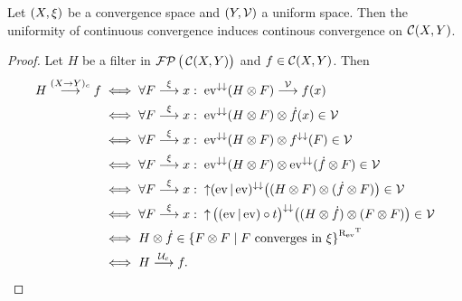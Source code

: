 \begin{lemma}
Let $\left( X, \xi \right)$ be a convergence space and $\left( Y, \mathcal{V} \right)$ a uniform space. Then the uniformity of continuous convergence induces continous convergence on $\operatorname{\mathcal{C}}(X, Y)$.
\end{lemma}
\begin{proof}
Let $H$ be a filter in $\operatorname{\mathcal{FP}}\big(\operatorname{\mathcal{C}}(X,Y)\big)$ and $f\in \operatorname{\mathcal{C}}(X, Y)$. Then
\begin{align*}
H\overset{(X\to Y)_c}{\longrightarrow} f &\iff \forall F\overset{\xi}{\longrightarrow}x: \; \operatorname{ev}^{\downarrow\downarrow}(H\otimes F) \overset{\mathcal{V}}{\longrightarrow} f(x) \\
&\iff \forall F\overset{\xi}{\longrightarrow}x: \; \operatorname{ev}^{\downarrow\downarrow}(H\otimes F)\otimes \dot{f}(x) \in\mathcal{V} \\
&\iff \forall F\overset{\xi}{\longrightarrow}x: \; \operatorname{ev}^{\downarrow\downarrow}(H\otimes F)\otimes f^{\downarrow\downarrow}(F) \in\mathcal{V} \\
&\iff \forall F\overset{\xi}{\longrightarrow}x: \; \operatorname{ev}^{\downarrow\downarrow}(H\otimes F)\otimes \operatorname{ev}^{\downarrow\downarrow}(\dot{f}\otimes F) \in\mathcal{V} \\
&\iff \forall F\overset{\xi}{\longrightarrow}x: \; \operatorname{\uparrow}(\operatorname{ev}|\operatorname{ev})^{\downarrow\downarrow}\big((H\otimes F)\otimes(\dot{f}\otimes F)\big) \in\mathcal{V} \\
&\iff \forall F\overset{\xi}{\longrightarrow}x: \; \operatorname{\uparrow}\big((\operatorname{ev}|\operatorname{ev})\circ t\big)^{\downarrow\downarrow}\big((H\otimes \dot{f})\otimes(F\otimes F)\big) \in\mathcal{V} \\
&\iff H\otimes \dot{f}\in \left\{ F\otimes F \;\middle|\; \text{$F$ converges in $\xi$} \right\}^{\mathrel{\mathrm{R}_{\operatorname{ev}}}^{\mathrm{T}}} \\
&\iff H\overset{\mathcal{U}_c}{\longrightarrow} f.
\end{align*}
\end{proof}

